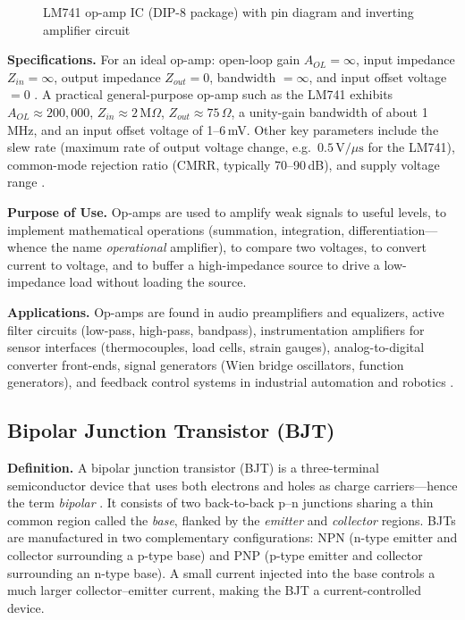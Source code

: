 \documentclass[12pt, a4paper, twoside]{report}
\newcommand{\imgplaceholder}[2]{%
  \begin{figure}[H]
    \centering
    \fcolorbox{gray!60}{gray!12}{%
      \parbox[c][5cm][c]{0.65\textwidth}{%
        \centering
        \textcolor{gray!80}{\Large [Image Placeholder]}\\[6pt]
        \textcolor{gray}{\small Insert figure here}
      }%
    }
    \caption{#1}
    \label{fig:#2}
  \end{figure}
}
\begin{document}
\imgplaceholder{LM741 op-amp IC (DIP-8 package) with pin diagram and inverting amplifier circuit}{opamp}

\textbf{Specifications.}\quad
For an ideal op-amp: open-loop gain $A_{OL} = \infty$, input impedance $Z_{in} = \infty$,
output impedance $Z_{out} = 0$, bandwidth $= \infty$, and input offset voltage $= 0$
\cite{electronics_tuts:opamp}. A practical general-purpose op-amp such as the LM741
exhibits $A_{OL} \approx 200{,}000$, $Z_{in} \approx 2\,\text{M}\Omega$, $Z_{out} \approx
75\,\Omega$, a unity-gain bandwidth of about 1\,MHz, and an input offset voltage of
1--6\,mV. Other key parameters include the slew rate (maximum rate of output voltage
change, e.g.\ $0.5\,\text{V}/\mu\text{s}$ for the LM741), common-mode rejection ratio
(CMRR, typically 70--90\,dB), and supply voltage range \cite{horowitz2015}.

\textbf{Purpose of Use.}\quad
Op-amps are used to amplify weak signals to useful levels, to implement mathematical
operations (summation, integration, differentiation---whence the name \textit{operational}
amplifier), to compare two voltages, to convert current to voltage, and to buffer a
high-impedance source to drive a low-impedance load without loading the source.

\textbf{Applications.}\quad
Op-amps are found in audio preamplifiers and equalizers, active filter circuits (low-pass,
high-pass, bandpass), instrumentation amplifiers for sensor interfaces (thermocouples,
load cells, strain gauges), analog-to-digital converter front-ends, signal generators
(Wien bridge oscillators, function generators), and feedback control systems in industrial
automation and robotics \cite{sedra2020}.

\subsection{Bipolar Junction Transistor (BJT)}

\textbf{Definition.}\quad
A bipolar junction transistor (BJT) is a three-terminal semiconductor device that uses
both electrons and holes as charge carriers---hence the term \textit{bipolar}
\cite{boylestad2015}. It consists of two back-to-back p--n junctions sharing a thin common
region called the \textit{base}, flanked by the \textit{emitter} and \textit{collector}
regions. BJTs are manufactured in two complementary configurations: NPN (n-type emitter
and collector surrounding a p-type base) and PNP (p-type emitter and collector surrounding
an n-type base). A small current injected into the base controls a much larger
collector--emitter current, making the BJT a current-controlled device.
\end{document}
